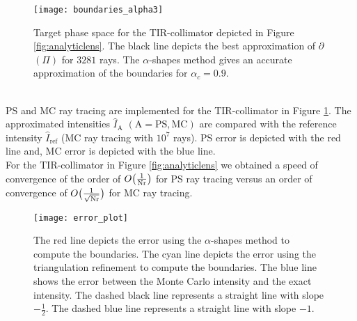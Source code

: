  \begin{figure}[h]
  \begin{center}
       \texttt{[image: boundaries\_alpha3]}
   \end{center}
        \caption{Target phase space for the TIR-collimator depicted in
        Figure \ref{fig:analyticlens}. The black line depicts the best approximation of $\partial$$(\Pi)$ for $3281$ rays. 
The $\alpha$-shapes method gives an accurate approximation of the boundaries for $\alpha_c = 0.9$.}
  \label{fig:Tir2}
\end{figure}
\\ \indent PS and MC ray tracing are implemented for the TIR-collimator in Figure \ref{fig:Tir2}. The approximated intensities $\hat{I}_{\textrm{A}}$ $(\textrm{A} = \textrm{PS}, \textrm{MC})$ are compared with the reference intensity $\hat{I}_{\textrm{ref}}$ (MC ray tracing with $10^7$ rays).
PS error is depicted with the red line and, MC error is depicted with the blue line.\\ \indent
For the TIR-collimator in Figure \ref{fig:analyticlens} we obtained a speed of convergence of the order of $O\big(\frac{1}{\textrm{Nr}}\big)$ for PS ray tracing versus an order of convergence of $O\big(\frac{1}{\sqrt{\textrm{Nr}}}\big)$ for MC ray tracing.
\begin{figure}[h!]
 \begin{center}
   \texttt{[image: error\_plot]}
    \end{center}
     \caption{The red line depicts the error using the $\alpha$-shapes method to compute the boundaries. The cyan line depicts the error using the triangulation refinement to compute the boundaries.
     The blue line shows the error between the Monte Carlo intensity and the exact intensity.
     The dashed black line represents a straight line with slope $-\frac{1}{2}$.
   The dashed blue line represents a straight line with slope $-1$.}
 \label{fig:error2}
\end{figure}
